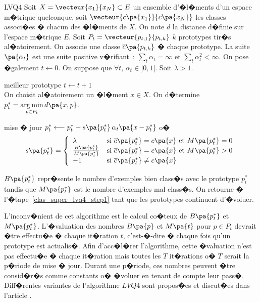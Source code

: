         \begin{xalgorithm}{LVQ4}
        Soit $X = \vecteur{x_1}{x_N} \subset E$ un ensemble d'�l�ments d'un espace m�trique quelconque, 
        soit $\vecteur{c\pa{x_1}}{c\pa{x_N}}$ les classes associ�es � chacun des �l�ments de $X$. On note 
        $d$ la distance d�finie sur l'espace m�trique $E$.
        Soit $P_t = \vecteur{p_{t,1}}{p_{t,k}}$ $k$ prototypes tir�s al�atoirement.    
        On associe une classe $\overline{c}\pa{p_{t,k}}$ � chaque 
        prototype. La suite $\pa{\alpha_t}$ est une suite positive v�rifiant~: 
        $\sum_t \alpha_t = \infty$ et $\sum_t \alpha_t^2 < \infty$. On pose �galement $t \longleftarrow 0$. 
        On suppose que $\forall t, \, \alpha_t \in ]0,1[$. Soit $\lambda > 1$.

        \begin{xalgostep}{meilleur prototype}\label{clas_super_lvq4_step1}
        $t \longleftarrow t +1$ \\
        On choisit al�atoirement un �l�ment $x \in X$.
        On d�termine $p^*_t = \underset{p \in P_t}{\arg \min} \, d\pa{x,p}$.
        \end{xalgostep}

        \begin{xalgostep}{mise � jour}
        $p^*_t  \longleftarrow p^*_t  + s\pa{p^*_t} \, \alpha_t \pa{ x - p^*_t}$ o�
        $$ s\pa{p^*_t} = \left\{ \begin{array}{ll}
                 \lambda                                                     & \text{si } \overline{c}\pa{p^*_t} = c\pa{x} \text{ et } M\pa{p^*_t} = 0\\
                 \frac{B\pa{p^*_t}}{M\pa{p^*_t}}     & \text{si } \overline{c}\pa{p^*_t} = c\pa{x} \text{ et } M\pa{p^*_t} > 0\\
                 -1                                                             & \text{si } \overline{c}\pa{p^*_t} \neq c\pa{x}
                 \end{array} \right.$$
        
        $B\pa{p^*_t}$ repr�sente le nombre d'exemples bien class�s avec le prototype $p^*_t$ 
        tandis que $M\pa{p^*_t}$ est le nombre d'exemples mal class�s. 
        On retourne � l'�tape~\ref{clas_super_lvq4_step1} tant que les prototypes continuent d'�voluer.
        \end{xalgostep}
        \end{xalgorithm}

L'inconv�nient de cet algorithme est le calcul co�teux de $B\pa{p^*_t}$ et $M\pa{p^*_t}$. L'�valuation des nombres $B\pa{p}$ et $M\pa{t}$ pour $p \in P_t$ devrait �tre effectu�e � chaque it�ration $t$, c'est-�-dire � chaque fois qu'un prototype est actualis�. Afin d'acc�l�rer l'algorithme, cette �valuation n'est pas effectu�e � chaque it�ration mais toutes les $T$ it�rations o� $T$ serait la p�riode de mise � jour. Durant une p�riode, ces nombres peuvent �tre consid�r�s comme constants o� �voluer en tenant de compte leur pass�. Diff�rentes variantes de l'algorithme $LVQ4$ sont propos�es et discut�es dans l'article .





